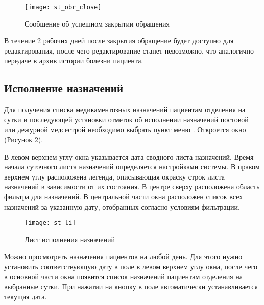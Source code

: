 \begin{figure}[!ht]\centering
   \texttt{[image: st\_obr\_close]}
   \caption{Сообщение об успешном закрытии обращения}
   \label{img_st_obr_close}
\end{figure} 

В течение 2 рабочих дней после закрытия обращение будет доступно для редактирования, после чего редактирование станет невозможно, что аналогично передаче в архив истории болезни пациента.

\subsection{Исполнение назначений}

Для получения списка медикаментозных назначений пациентам отделения на сутки и последующей установки отметок об исполнении назначений постовой или дежурной медсестрой необходимо выбрать пункт меню . Откроется окно  (Рисунок \ref{img_st_li}).

В левом верхнем углу окна указывается дата сводного листа назначений. Время начала суточного листа назначений определяется настройками системы. В правом верхнем углу расположена легенда, описывающая окраску строк листа назначений в зависимости от их состояния. В центре сверху расположена область фильтра для назначений. В центральной части окна расположен список всех назначений за указанную дату, отобранных согласно условиям фильтрации. 

\begin{figure}[ht]\centering
   \texttt{[image: st\_li]}
   \caption{Лист исполнения назначений}
   \label{img_st_li}
\end{figure} 

Можно просмотреть назначения пациентов на любой день. Для этого нужно установить соответствующую дату в поле  в левом верхнем углу окна, после чего в основной части окна появится список назначений пациентам отделения на выбранные сутки. При нажатии на кнопку  в поле  автоматически устанавливается текущая дата. 

